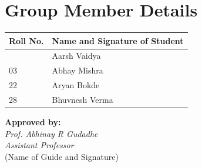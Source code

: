 \documentclass[12pt,a4paper]{article}
\newcommand{\rowsep}{\arrayrulecolor{rowline}\midrule\arrayrulecolor{black}}
\newcommand{\hd}[1]{\textbf{#1}}
\begin{document}
\clearpage
\section{Group Member Details}

{\small\singlespacing
\begin{tabularx}{\linewidth}{@{}>{\centering\arraybackslash}p{20mm}X@{}}
\toprule
\hd{Roll No.} & \hd{Name and Signature of Student} \\
\midrule
01 & Aarsh Vaidya \\ \rowsep
03 & Abhay Mishra \\ \rowsep
22 & Aryan Bokde \\ \rowsep
28 & Bhuvnesh Verma \\
\bottomrule
\end{tabularx}}

\vspace{18pt}
{\bfseries Approved by:}\\[2pt]
\textit{Prof. Abhinay R Gudadhe}\\
\textit{Assistant Professor}\\
{\footnotesize\color{soft} (Name of Guide and Signature)}
\end{document}
